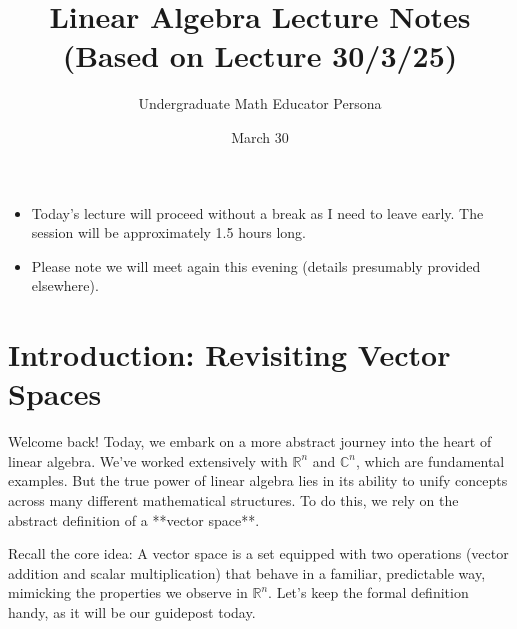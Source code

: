 \documentclass[11pt]{article}
\title{Linear Algebra Lecture Notes \\ (Based on Lecture 30/3/25)}
\author{Undergraduate Math Educator Persona}
\date{March 30} %
\theoremstyle{definition}
\theoremstyle{remark}
\newcommand{\R}{\mathbb{R}}
\newcommand{\C}{\mathbb{C}}
\begin{document}
\maketitle

\begin{announcement}
    \begin{itemize}
        \item Today's lecture will proceed without a break as I need to leave early. The session will be approximately 1.5 hours long.
        \item Please note we will meet again this evening (details presumably provided elsewhere).
    \end{itemize}
\end{announcement}

\section{Introduction: Revisiting Vector Spaces}

Welcome back! Today, we embark on a more abstract journey into the heart of linear algebra. We've worked extensively with $\R^n$ and $\C^n$, which are fundamental examples. But the true power of linear algebra lies in its ability to unify concepts across many different mathematical structures. To do this, we rely on the abstract definition of a **vector space**.

Recall the core idea: A vector space is a set equipped with two operations (vector addition and scalar multiplication) that behave in a familiar, predictable way, mimicking the properties we observe in $\R^n$. Let's keep the formal definition handy, as it will be our guidepost today.
\end{document}
